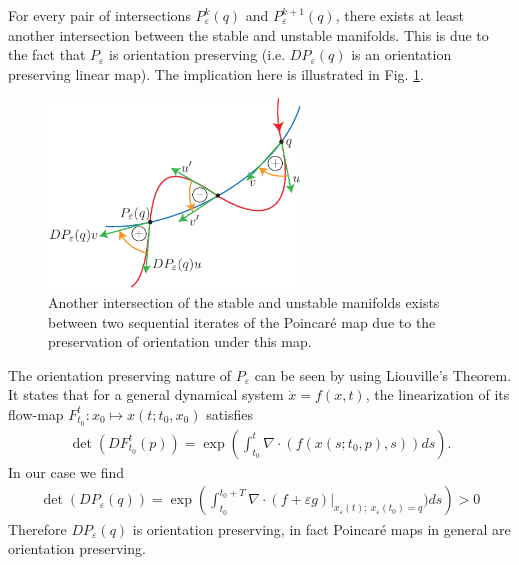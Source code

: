 \begin{remark}[]
	For every pair of intersections $P_{\varepsilon}^{k}(q)$ and $P _{\varepsilon}^{k+1}(q)$, there exists at least another intersection between the stable and unstable manifolds. This is due to the fact that $P_{\varepsilon}$ is orientation preserving (i.e. $DP_{\varepsilon}(q)$ is an orientation preserving linear map). The implication here is illustrated in Fig. \ref{fig:between_intersections}.
\begin{figure}[h!]
	\centering
	\includegraphics[width=0.6\textwidth]{figures/ch6/13between_intersections.pdf}
	\caption{Another intersection of the stable and unstable manifolds exists between two sequential iterates of the Poincaré map due to the preservation of orientation under this map.}
	\label{fig:between_intersections}
\end{figure}

The orientation preserving nature of $P_{\varepsilon}$ can be seen by using Liouville's Theorem. It states that for a general dynamical system $\dot{x}=f(x,t)$, the linearization of its flow-map $F_{t_0}^t:x_0 \mapsto x(t;t_0, x_0)$ satisfies 
	\begin{align}
		\det(DF_{t_0}^{t}(p)) = \exp \left( \int_{t_0}^{t}  \nabla \cdot ( f(x(s;t_0,p),s))ds\right).
	\end{align}
In our case we find
	\begin{align}
		\det (DP_{\varepsilon}(q)) = \exp\left(\int_{t_0}^{t_0+T} \nabla \cdot \left. (f + \varepsilon g) \right|_{x_{\varepsilon}(t);\ x_{\varepsilon}(t_0)=q}) ds \right) > 0
	\end{align}
	Therefore $DP_{\varepsilon}(q)$ is orientation preserving, in fact Poincaré maps in general are orientation preserving.	
\end{remark}

